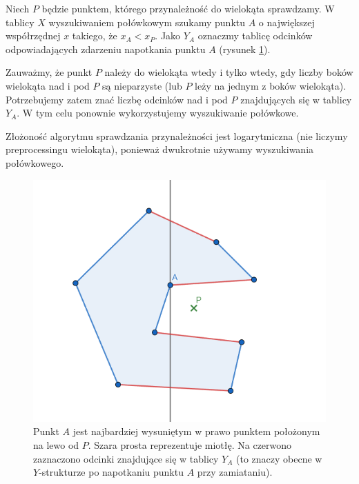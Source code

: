 Niech $P$ będzie punktem, którego przynależność do wielokąta sprawdzamy. W tablicy $X$ wyszukiwaniem połówkowym szukamy punktu $A$ o największej współrzędnej $x$ takiego, że $x_A < x_P$. Jako $Y_A$ oznaczmy tablicę odcinków odpowiadających zdarzeniu napotkania punktu $A$ (rysunek \ref{fig:zad73}). 

Zauważmy, że punkt $P$ należy do wielokąta wtedy i tylko wtedy, gdy liczby boków wielokąta nad i pod $P$ są nieparzyste (lub $P$ leży na jednym z boków wielokąta). Potrzebujemy zatem znać liczbę odcinków nad i pod $P$ znajdujących się w tablicy $Y_A$. W tym celu ponownie wykorzystujemy wyszukiwanie połówkowe.

Złożoność algorytmu sprawdzania przynależności jest logarytmiczna (nie liczymy preprocessingu wielokąta), ponieważ dwukrotnie używamy wyszukiwania połówkowego.

\begin{figure}[H]
	\centering
	\includegraphics[height=0.45\linewidth]{data/zad73.png}
	\caption{Punkt $A$ jest najbardziej wysuniętym w prawo punktem położonym na lewo od $P$. Szara prosta reprezentuje miotłę. Na czerwono zaznaczono odcinki znajdujące się w tablicy $Y_A$ (to znaczy obecne w $Y$-strukturze po napotkaniu punktu $A$ przy zamiataniu).}	
	\label{fig:zad73}
\end{figure}


